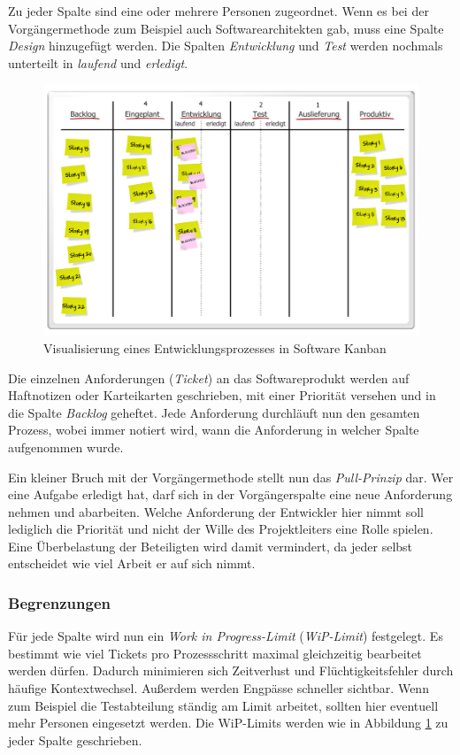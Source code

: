 Zu jeder Spalte sind eine oder mehrere Personen zugeordnet. Wenn es bei der Vorgängermethode zum Beispiel auch Softwarearchitekten gab, muss eine Spalte \emph{Design} hinzugefügt werden. Die Spalten \emph{Entwicklung} und \emph{Test} werden nochmals unterteilt in \emph{laufend} und \emph{erledigt}. 

\begin{figure}[h]
  \centering
  \includegraphics[width=1\textwidth]{images/kanbanBoard}
  \caption{Visualisierung eines Entwicklungsprozesses in Software Kanban \cite{bib:roock}}
  \label{fig:kanbanBoard}
\end{figure}

Die einzelnen Anforderungen (\emph{Ticket}) an das Softwareprodukt werden auf Haftnotizen oder Karteikarten geschrieben, mit einer Priorität versehen und in die Spalte \emph{Backlog} geheftet. Jede Anforderung durchläuft nun den gesamten Prozess, wobei immer notiert wird, wann die Anforderung in welcher Spalte aufgenommen wurde.

Ein kleiner Bruch mit der Vorgängermethode stellt nun das \emph{Pull-Prinzip} dar. Wer eine Aufgabe erledigt hat, darf sich in der Vorgängerspalte eine neue Anforderung nehmen und abarbeiten. Welche Anforderung der Entwickler hier nimmt soll lediglich die Priorität und nicht der Wille des Projektleiters eine Rolle spielen. Eine Überbelastung der Beteiligten wird damit vermindert, da jeder selbst entscheidet wie viel Arbeit er auf sich nimmt.

\subsubsection{Begrenzungen}
Für jede Spalte wird nun ein \emph{Work in Progress-Limit} (\emph{WiP-Limit}) festgelegt. Es bestimmt wie viel Tickets pro Prozessschritt maximal gleichzeitig bearbeitet werden dürfen. Dadurch minimieren sich Zeitverlust und Flüchtigkeitsfehler durch häufige Kontextwechsel. Außerdem werden Engpässe schneller sichtbar. Wenn zum Beispiel die Testabteilung ständig am Limit arbeitet, sollten hier eventuell mehr Personen eingesetzt werden.
Die WiP-Limits werden wie in Abbildung \ref{fig:kanbanBoard} zu jeder Spalte geschrieben.


